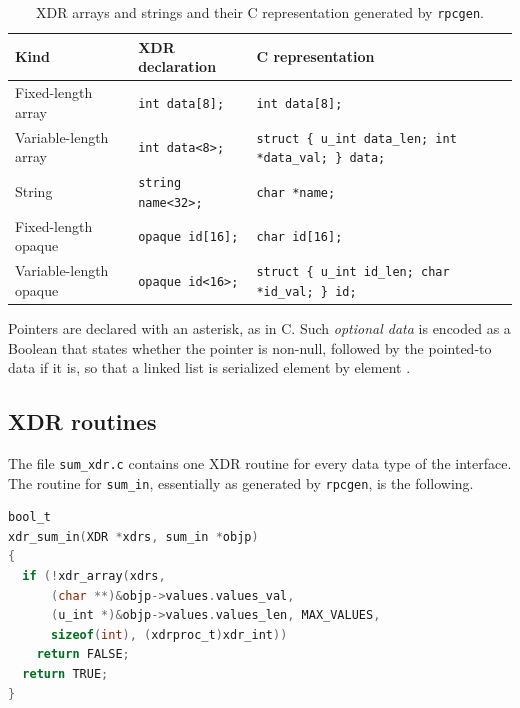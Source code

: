 \documentclass[../main.tex]{subfiles}
\begin{document}
\begin{table}[htbp]
  \centering
  \caption{XDR arrays and strings and their C representation generated by
    \texttt{rpcgen}.}
  \label{tab:l13-xdr-types}
  \small
  \begin{tabular}{@{}>{\raggedright}p{27mm}>{\raggedright}p{31mm}%
      >{\raggedright\arraybackslash}p{52mm}@{}}
    \toprule
    Kind & XDR declaration & C representation \\
    \midrule
    Fixed-length array & \texttt{int data[8];} & \texttt{int data[8];} \\
    \addlinespace
    Variable-length array & \texttt{int data<8>;}
      & \texttt{struct \{ u\_int data\_len; int *data\_val; \} data;} \\
    \addlinespace
    String & \texttt{string name<32>;} & \texttt{char *name;} \\
    \addlinespace
    Fixed-length opaque & \texttt{opaque id[16];} & \texttt{char id[16];} \\
    \addlinespace
    Variable-length opaque & \texttt{opaque id<16>;}
      & \texttt{struct \{ u\_int id\_len; char *id\_val; \} id;} \\
    \bottomrule
  \end{tabular}
\end{table}

Pointers are declared with an asterisk, as in C.  Such \emph{optional
data} is encoded as a Boolean that states whether the pointer is non-null,
followed by the pointed-to data if it is, so that a linked list is
serialized element by element \cite{rfc4506}.

\subsection{XDR routines}

The file \texttt{sum\_xdr.c} contains one XDR routine for every data type
of the interface.  The routine for \texttt{sum\_in}, essentially as
generated by \texttt{rpcgen}, is the following.

\begin{lstlisting}[language=C, numbers=none]
bool_t
xdr_sum_in(XDR *xdrs, sum_in *objp)
{
  if (!xdr_array(xdrs,
      (char **)&objp->values.values_val,
      (u_int *)&objp->values.values_len, MAX_VALUES,
      sizeof(int), (xdrproc_t)xdr_int))
    return FALSE;
  return TRUE;
}
\end{lstlisting}
\end{document}
